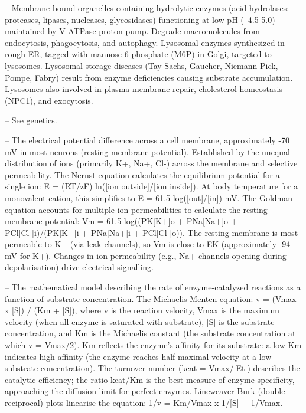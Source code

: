 -- Membrane-bound organelles containing hydrolytic enzymes (acid hydrolases: proteases, lipases, nucleases, glycosidases) functioning at low pH (~4.5-5.0) maintained by V-ATPase proton pump. Degrade macromolecules from endocytosis, phagocytosis, and autophagy. Lysosomal enzymes synthesized in rough ER, tagged with mannose-6-phosphate (M6P) in Golgi, targeted to lysosomes. Lysosomal storage diseases (Tay-Sachs, Gaucher, Niemann-Pick, Pompe, Fabry) result from enzyme deficiencies causing substrate accumulation. Lysosomes also involved in plasma membrane repair, cholesterol homeostasis (NPC1), and exocytosis.

-- See genetics.

-- The electrical potential difference across a cell membrane, approximately -70 mV in most neurons (resting membrane potential). Established by the unequal distribution of ions (primarily K+, Na+, Cl-) across the membrane and selective permeability. The Nernst equation calculates the equilibrium potential for a single ion: E = (RT/zF) ln([ion outside]/[ion inside]). At body temperature for a monovalent cation, this simplifies to E = 61.5 log([out]/[in]) mV. The Goldman equation accounts for multiple ion permeabilities to calculate the resting membrane potential: Vm = 61.5 log((PK[K+]o + PNa[Na+]o + PCl[Cl-]i)/(PK[K+]i + PNa[Na+]i + PCl[Cl-]o)). The resting membrane is most permeable to K+ (via leak channels), so Vm is close to EK (approximately -94 mV for K+). Changes in ion permeability (e.g., Na+ channels opening during depolarisation) drive electrical signalling.

-- The mathematical model describing the rate of enzyme-catalyzed reactions as a function of substrate concentration. The Michaelis-Menten equation: v = (Vmax x [S]) / (Km + [S]), where v is the reaction velocity, Vmax is the maximum velocity (when all enzyme is saturated with substrate), [S] is the substrate concentration, and Km is the Michaelis constant (the substrate concentration at which v = Vmax/2). Km reflects the enzyme's affinity for its substrate: a low Km indicates high affinity (the enzyme reaches half-maximal velocity at a low substrate concentration). The turnover number (kcat = Vmax/[Et]) describes the catalytic efficiency; the ratio kcat/Km is the best measure of enzyme specificity, approaching the diffusion limit for perfect enzymes. Lineweaver-Burk (double reciprocal) plots linearise the equation: 1/v = Km/Vmax x 1/[S] + 1/Vmax.

